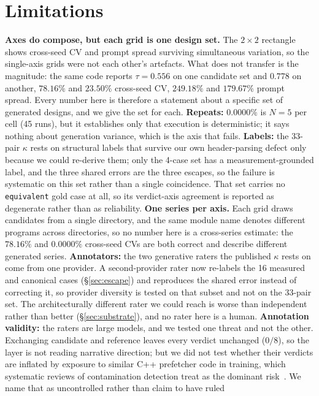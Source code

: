 \documentclass[10pt,twocolumn]{article}
\begin{document}
\section{Limitations}
\textbf{Axes do compose, but each grid is one design set.} The $2\times2$ rectangle
shows cross-seed CV and prompt spread surviving simultaneous variation, so the
single-axis grids were not each other's artefacts. What does not transfer is the
magnitude: the same code reports $\tau=0.556$ on one candidate set and $0.778$ on
another, $78.16\%$ and $23.50\%$ cross-seed CV, $249.18\%$ and $179.67\%$ prompt
spread. Every number here is therefore a statement about a specific set of generated
designs, and we give the set for each.
\textbf{Repeats:} $0.0000\%$ is $N=5$ per cell (45 runs), but it establishes only
that execution is deterministic; it says nothing about generation variance, which
is the axis that fails. \textbf{Labels:} the 33-pair $\kappa$ rests on structural
labels that survive our own header-parsing defect only because we could re-derive
them; only the 4-case set has a measurement-grounded label, and the three shared errors are the three escapes, so the
failure is systematic on this set rather than a single coincidence. That set carries no \texttt{equivalent} gold case at all, so its verdict-axis agreement is reported as degenerate rather than as reliability.
\textbf{One series per axis.} Each grid draws candidates from a single directory, and
the same module name denotes different programs across directories, so no number here
is a cross-series estimate: the $78.16\%$ and $0.0000\%$ cross-seed CVs are both
correct and describe different generated series.
\textbf{Annotators:} the two generative raters the published $\kappa$ rests on come from
one provider. A second-provider rater now re-labels the 16 measured and canonical cases
(\S\ref{sec:escape}) and reproduces the shared error instead of correcting it, so
provider diversity is tested on that subset and not on the 33-pair set. The
architecturally different rater we could reach is worse than independent rather than
better (\S\ref{sec:substrate}), and no rater here is a human.
\textbf{Annotation validity:} the raters are large models, and we tested one threat and
not the other. Exchanging candidate and reference leaves every verdict unchanged
($0/8$), so the layer is not reading narrative direction; but we did not test whether
their verdicts are inflated by exposure to similar C++ prefetcher code in training,
which systematic reviews of contamination detection treat as the dominant
risk~\cite{contamination}. We name that as uncontrolled rather than claim to have ruled
\end{document}
